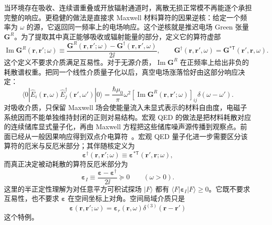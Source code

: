 当环境存在吸收、连续谱重叠或开放辐射通道时，离散无损正常模不再能逐个承担完整的响应。更稳健的做法是直接求 Maxwell 材料算符的因果逆核：给定一个频率为 $\omega$ 的源，它返回同一频率上的电场响应。这个逆核就是推迟电场 Green 张量 $\mathbf G^R$。为了提取其中真正能够吸收或辐射能量的部分，定义它的算符虚部
\[
\operatorname{Im}\mathbf G^R(\mathbf r,\mathbf r';\omega)
\equiv
\frac{\mathbf G^R(\mathbf r,\mathbf r';\omega)
-\mathbf G^{\dagger}(\mathbf r,\mathbf r',\omega)}{2\ii},
\qquad
\mathbf G^{\dagger}(\mathbf r,\mathbf r',\omega)
=\mathbf G^{*\mathsf T}(\mathbf r',\mathbf r,\omega).
\]
这个定义不要求介质满足互易性。对于无源介质，$\operatorname{Im}\mathbf G^R$ 在正频率上给出非负的耗散谱权重。把同一个线性介质量子化以后，真空电场涨落恰好由这部分响应决定：
\begin{equation}
\boxed{
\langle0|
\hat E_i(\mathbf r,\omega)
\hat E_j^{\dagger}(\mathbf r',\omega')|0\rangle
=
\frac{\hbar\mu_0}{\pi}\omega^2
[\operatorname{Im}\mathbf G^R(\mathbf r,\mathbf r';\omega)]_{ij}
\delta(\omega-\omega').}
\label{eq:macroscopic_qed_fdt_green_tensor}
\end{equation}
对吸收介质，只保留 Maxwell 场会使能量流入未显式表示的材料自由度，电磁子系统因而不能单独维持封闭的正则对易结构。宏观 QED 的做法是把材料耗散对应的连续储库显式量子化，再由 Maxwell 方程把这些储库噪声源传播到观察点。前面已经从一般因果响应得到双点介电算符~。宏观 QED 量子化进一步需要区分该算符的厄米与反厄米部分；其伴随核定义为
\[
\boldsymbol\varepsilon^{\dagger}(\mathbf r,\mathbf r';\omega)
\equiv
\boldsymbol\varepsilon^{*\mathsf T}(\mathbf r',\mathbf r;\omega),
\]
而真正决定被动耗散的算符反厄米部分为
\begin{equation}
\boxed{
\boldsymbol\varepsilon_I
\equiv
\frac{\boldsymbol\varepsilon-\boldsymbol\varepsilon^\dagger}{2\ii}
\succeq0
\qquad (\omega>0).}
\label{eq:nonlocal_permittivity_dissipative_part}
\end{equation}
这里的半正定性理解为对任意平方可积试探场 $|F\rangle$ 都有
$\langle F|\boldsymbol\varepsilon_I|F\rangle\ge0$。它既不要求互易性，也不要求
$\boldsymbol\varepsilon$ 在空间坐标上对角。空间局域介质只是
\[
\boldsymbol\varepsilon(\mathbf r,\mathbf r';\omega)
=\boldsymbol\varepsilon_r(\mathbf r,\omega)
\delta^{(3)}(\mathbf r-\mathbf r')
\]
这个特例。

